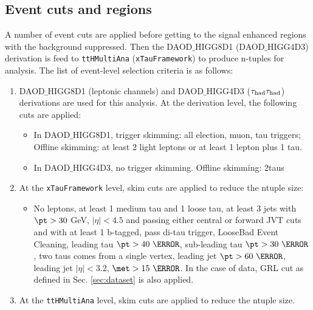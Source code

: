 \subsection{Event cuts and regions}
\label{sec:cuts}

A number of event cuts are applied before getting to the signal enhanced regions with the background suppressed. Then the DAOD$\_$HIGG8D1 (DAOD$\_$HIGG4D3) derivation is feed to {\tt ttHMultiAna} ({\tt xTauFramework}) to produce n-tuples for analysis. The list of event-level selection criteria is as follows:

\begin{enumerate}
\item DAOD$\_$HIGG8D1 (leptonic channels) and DAOD$\_$HIGG4D3 ($\tau_\text{had}{}\tau_\text{had}$) derivations are used for this analysis. At the derivation level, the following cuts are applied:
  \begin{itemize}


  \item In DAOD$\_$HIGG8D1, trigger skimming: all election, muon, tau triggers; Offline skimming: at least 2 light leptons or at least 1 lepton plus 1 tau.
  \item In DAOD$\_$HIGG4D3, no trigger skimming. Offline skimming: 2taus
  \end{itemize}

\item At the {\tt xTauFramework} level, skim cuts are applied to reduce the ntuple size:
  \begin{itemize}
  \item No leptons, at least 1 medium tau and 1 loose tau, at least 3 jets with $\pt>30$ GeV, $|\eta|<4.5$ and passing either central or forward JVT cuts and with at least 1 b-tagged, pass di-tau trigger, LooseBad Event Cleaning, leading tau $\pt>40~\GeV$, sub-leading tau $\pt>30~\GeV$, two taus comes from a single vertex, leading jet $\pt>60~\GeV$, leading jet $|\eta|<3.2$, $\met>15~\GeV$. In the case of data, GRL cut as defined in Sec. \ref{sec:dataset} is also applied.
  \end{itemize}

\item At the {\tt ttHMultiAna} level, skim cuts \cite{ATL-COM-PHYS-2018-410} are applied to reduce the ntuple size.


\end{enumerate}
